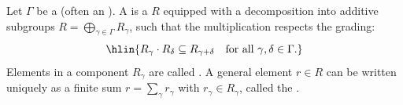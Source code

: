 \begin{definition} \label{definition:graded_ring_by_a_monoid}
Let $\Gamma$ be a  (often an ). 
A  is a  $R$ equipped with a decomposition into additive subgroups $R = \bigoplus_{\gamma \in \Gamma} R_\gamma$, such that the multiplication respects the grading:
$$\hlin{R_\gamma \cdot R_\delta \subseteq R_{\gamma + \delta} \quad \text{for all } \gamma, \delta \in \Gamma.}$$
Elements in a component $R_\gamma$ are called . A general element $r \in R$ can be written uniquely as a finite sum $r = \sum_{\gamma} r_\gamma$ with $r_\gamma \in R_\gamma$, called the .
\end{definition}